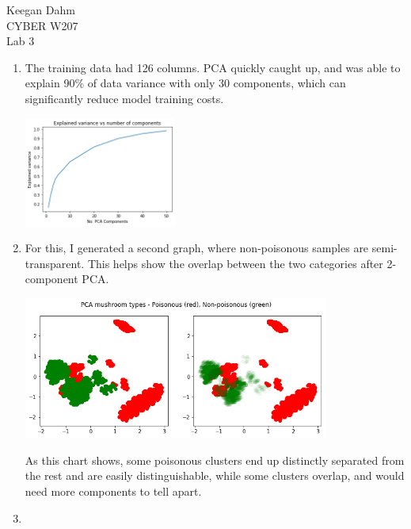 \documentclass{article}
\begin{document}

\begin{flushright}
Keegan Dahm \\
CYBER W207 \\
Lab 3
\end{flushright}

\begin{enumerate}[start=1]
\item %
    The training data had 126 columns. PCA quickly caught up, and was able to explain 90\% of data variance with only 30 components, which can significantly reduce model training costs.
    
    \begin{center}
    \includegraphics[width=5cm]{part1.0.png}
    \end{center}

\item %
    For this, I generated a second graph, where non-poisonous samples are semi-transparent. This helps show the overlap between the two categories after 2-component PCA.
    
    \begin{center}
    \includegraphics[width=10cm]{part2.0.png}
    \end{center}
    
    As this chart shows, some poisonous clusters end up distinctly separated from the rest and are easily distinguishable, while some clusters overlap, and would need more components to tell apart.
    
\item %
    

\end{enumerate}
\end{document}
